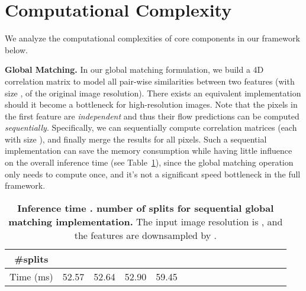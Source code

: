 \documentclass[10pt,twocolumn,letterpaper]{article}
\begin{document}
\section{Computational Complexity}

We analyze the computational complexities of core components in our framework below.

{\bf Global Matching.} In our global matching formulation, we build a 4D correlation matrix  to model all pair-wise similarities between two features (with size ,  of the original image resolution). There exists an equivalent implementation should it become a bottleneck for high-resolution images. Note that the pixels in the first feature are \emph{independent} and thus their flow predictions can be computed \emph{sequentially}. Specifically, we can sequentially compute  correlation matrices (each with size ), and finally merge the results for all pixels. Such a sequential implementation can save the memory consumption while having little influence on the overall inference time (see Table~\ref{tab:seq_global_match}), since the global matching operation only needs to compute once, and it's not a significant speed bottleneck in the full framework.

\begin{table}[H]
    \centering
    \setlength{\tabcolsep}{3.pt} \begin{tabular}{cccccccccccccccc}
    \toprule
    
    \#splits &  &  &  &  \\
    
    \midrule
    
    Time (ms) & 52.57 & 52.64 & 52.90 & 59.45 \\
    
    \bottomrule
    \end{tabular}
    \vspace{-5pt}
    \caption{\textbf{Inference time \vs. number of splits for sequential global matching implementation.} The input image resolution is , and the features are downsampled by .
    }
    \label{tab:seq_global_match}
    \vspace{-10pt}
    
\end{table}
\end{document}
